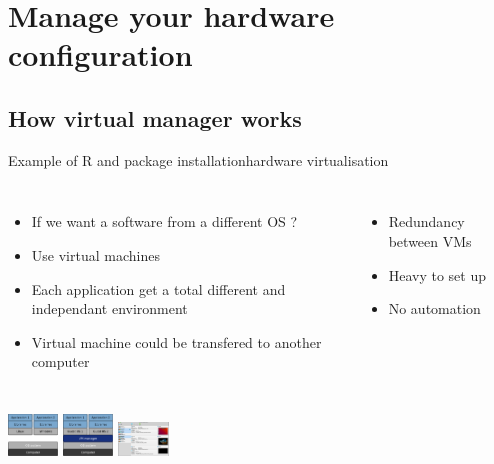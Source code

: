 \section{Manage your hardware configuration}
\subsection{How virtual manager works}

\begin{frame}{Example of R and package installation}{hardware virtualisation}
\begin{columns}
\begin{itemize}
	\item If we want a software from a different OS ?
	\item Use virtual machines
	\item Each application get a total different and independant environment
	\item Virtual machine could be transfered to another computer
\end{itemize}
\begin{itemize}
	\item Redundancy between VMs
	\item Heavy to set up
	\item No automation
\end{itemize}
\end{columns}
\includegraphics[width=0.1\textwidth]{images/VM_env_1.pdf} 
\includegraphics[width=0.1\textwidth]{images/VM_env_2.pdf} 
\includegraphics[width=0.1\textwidth]{images/virtualbox-main.png}
\end{frame}

